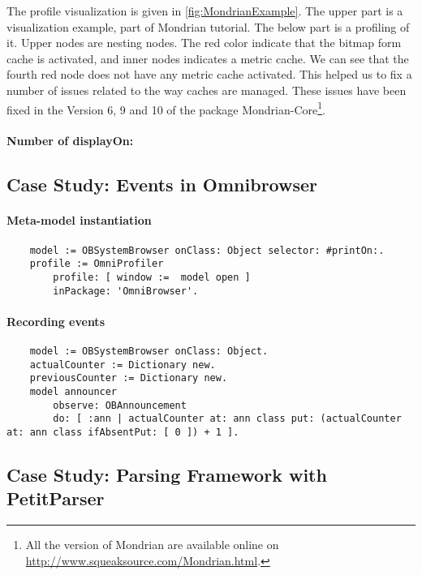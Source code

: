 \documentclass[runningheads]{llncs}
\begin{document}
The profile visualization is given in \autoref{fig:MondrianExample}. The upper part is a visualization example, part of Mondrian tutorial. The below part is a profiling of it. Upper nodes are nesting nodes. The red color indicate that the bitmap form cache is activated, and inner nodes indicates a metric cache. We can see that the fourth red node does not have any metric cache activated. This helped us to fix a number of issues related to the way caches are managed. These issues have been fixed in the Version 6, 9 and 10 of the package Mondrian-Core\footnote{All the version of Mondrian are available online on \url{http://www.squeaksource.com/Mondrian.html}.}.



\paragraph{Number of displayOn:}

\subsection{Case Study: Events in Omnibrowser}

\paragraph{Meta-model instantiation}
\begin{lstlisting}
	model := OBSystemBrowser onClass: Object selector: #printOn:.
	profile := OmniProfiler 
		profile: [ window :=  model open ]
		inPackage: 'OmniBrowser'.
\end{lstlisting}

\paragraph{Recording events}
\begin{lstlisting}
	model := OBSystemBrowser onClass: Object.
	actualCounter := Dictionary new.
	previousCounter := Dictionary new.
	model announcer
		observe: OBAnnouncement
		do: [ :ann | actualCounter at: ann class put: (actualCounter at: ann class ifAbsentPut: [ 0 ]) + 1 ].
\end{lstlisting}


\subsection{Case Study: Parsing Framework with PetitParser}
\end{document}
